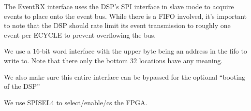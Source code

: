 The EventRX interface uses the DSP's SPI interface in slave mode to
acquire events to place onto the event bus. While there is a FIFO
involved, it's important to note that the DSP should rate limit its
event transmission to roughly one event per ECYCLE to prevent overflowing the bus. 

We use a 16-bit word interface with the upper byte being an address in
the fifo to write to. Note that there only the bottom 32 locations
have any meaning.

We also make sure this entire interface can be bypassed for the
optional ``booting of the DSP''

We use SPISEL4 to select/enable/cs the FPGA. 



